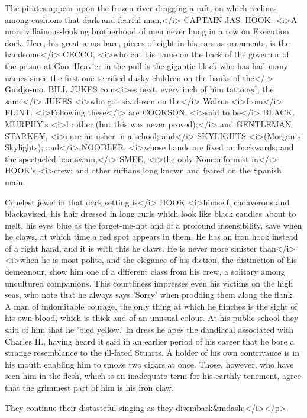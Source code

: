 \begin{stagedir}
The pirates appear upon the frozen river dragging a raft, on which reclines among cushions that dark and fearful man,</i> CAPTAIN JAS. HOOK. <i>A more villainous-looking brotherhood of men never hung in a row on Execution dock. Here, his great arms bare, pieces of eight in his ears as ornaments, is the handsome</i> CECCO, <i>who cut his name on the back of the governor of the prison at Gao. Heavier in the pull is the gigantic black who has had many names since the first one terrified dusky children on the banks of the</i> Guidjo-mo. BILL JUKES com<i>es next, every inch of him tattooed, the same</i> JUKES <i>who got six dozen on the</i> Walrus <i>from</i> FLINT. <i>Following these</i> are COOKSON, <i>said to be</i> BLACK. MURPHY's <i>brother (but this was never proved);</i> and GENTLEMAN STARKEY, <i>once an usher in a school; and</i> SKYLIGHTS <i>(Morgan's Skylights); and</i> NOODLER, <i>whose hands are fixed on backwards; and the spectacled boatswain,</i> SMEE, <i>the only Nonconformist in</i> HOOK's <i>crew; and other ruffians long known and feared on the Spanish main.

Cruelest jewel in that dark setting is</i> HOOK <i>himself, cadaverous and blackavised, his hair dressed in long curls which look like black candles about to melt, his eyes blue as the forget-me-not and of a profound insensibility, save when he claws, at which time a red spot appears in them. He has an iron hook instead of a right hand, and it is with this he claws. He is never more sinister than</i> <i>when he is most polite, and the elegance of his diction, the distinction of his demeanour, show him one of a different class from his crew, a solitary among uncultured companions. This courtliness impresses even his victims on the high seas, who note that he always says 'Sorry' when prodding them along the flank. A man of indomitable courage, the only thing at which he flinches is the sight of his own blood, which is thick and of an unusual colour. At his public school they said of him that he 'bled yellow.' In dress he apes the dandiacal associated with Charles II., having heard it said in an earlier period of his career that he bore a strange resemblance to the ill-fated Stuarts. A holder of his own contrivance is in his mouth enabling him to smoke two cigars at once. Those, however, who have seen him in the flesh, which is an inadequate term for his earthly tenement, agree that the grimmest part of him is his iron claw.

They continue their distasteful singing as they disembark&mdash;</i></p>
\end{stagedir}

